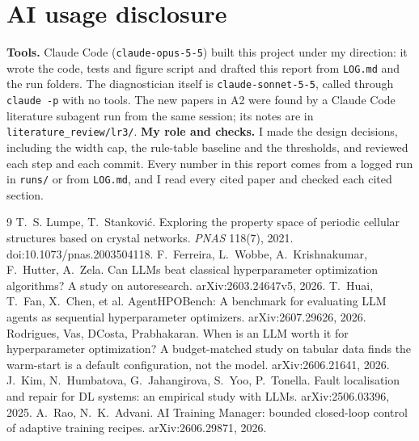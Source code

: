 \documentclass[11pt]{article}
\begin{document}
\section*{AI usage disclosure}
\textbf{Tools.} Claude Code (\texttt{claude-opus-5-5}) built this project under my direction: it
wrote the code, tests and figure script and drafted this report from \texttt{LOG.md} and the run
folders. The diagnostician itself is \texttt{claude-sonnet-5-5}, called through \texttt{claude -p}
with no tools. The new papers in A2 were found by a Claude Code literature subagent run from
the same session; its notes are in \texttt{literature\_review/lr3/}.
\textbf{My role and checks.} I made the design decisions, including the width cap, the rule-table
baseline and the thresholds, and reviewed each step and each commit. Every number in this report
comes from a logged run in \texttt{runs/} or from \texttt{LOG.md}, and I read every cited paper and
checked each cited section.

\begin{thebibliography}{9}\footnotesize\setlength{\itemsep}{0pt}
 T.~S. Lumpe, T.~Stankovi\'c. Exploring the property space of periodic cellular
  structures based on crystal networks. \emph{PNAS} 118(7), 2021. doi:10.1073/pnas.2003504118.
 F.~Ferreira, L.~Wobbe, A.~Krishnakumar, F.~Hutter, A.~Zela. Can LLMs beat
  classical hyperparameter optimization algorithms? A study on autoresearch. arXiv:2603.24647v5,
  2026.
 T.~Huai, T.~Fan, X.~Chen, et al. AgentHPOBench: A benchmark for evaluating LLM
  agents as sequential hyperparameter optimizers. arXiv:2607.29626, 2026.
 Rodrigues, Vas, DCosta, Prabhakaran. When is an LLM worth it for
  hyperparameter optimization? A budget-matched study on tabular data finds the warm-start is a
  default configuration, not the model. arXiv:2606.21641, 2026.
 J.~Kim, N.~Humbatova, G.~Jahangirova, S.~Yoo, P.~Tonella. Fault localisation and
  repair for DL systems: an empirical study with LLMs. arXiv:2506.03396, 2025.
 A.~Rao, N.~K.~Advani. AI Training Manager: bounded closed-loop control of adaptive
  training recipes. arXiv:2606.29871, 2026.
\end{thebibliography}
\end{document}

